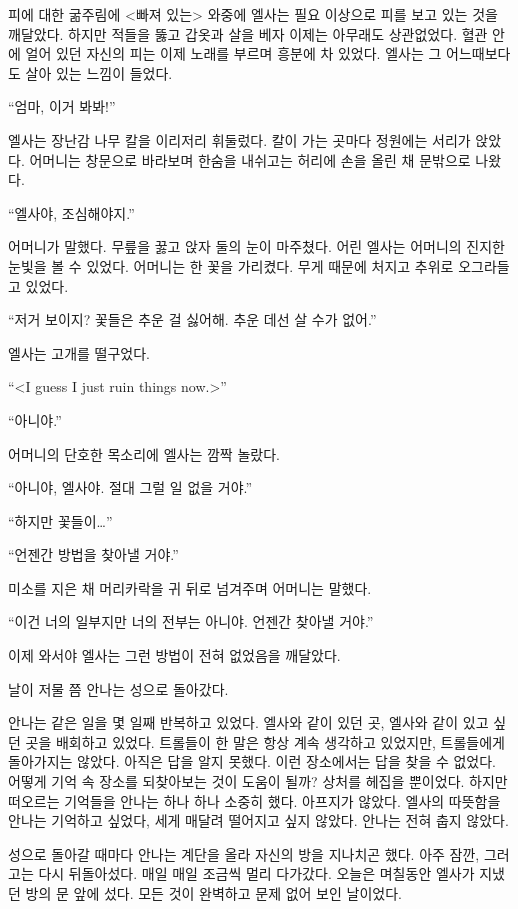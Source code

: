 피에 대한 굶주림에 <빠져 있는> 와중에 엘사는 필요 이상으로 피를 보고 있는 것을 깨달았다. 하지만 적들을 뚫고 갑옷과 살을 베자 이제는 아무래도 상관없었다. 혈관 안에 얼어 있던 자신의 피는 이제 노래를 부르며 흥분에 차 있었다. 엘사는 그 어느때보다도 살아 있는 느낌이 들었다.

``엄마, 이거 봐봐!''

엘사는 장난감 나무 칼을 이리저리 휘둘렀다. 칼이 가는 곳마다 정원에는 서리가 앉았다. 어머니는 창문으로 바라보며 한숨을 내쉬고는 허리에 손을 올린 채 문밖으로 나왔다.

``엘사야, 조심해야지.''

어머니가 말했다. 무릎을 꿇고 앉자 둘의 눈이 마주쳤다. 어린 엘사는 어머니의 진지한 눈빛을 볼 수 있었다. 어머니는 한 꽃을 가리켰다. 무게 때문에 처지고 추위로 오그라들고 있었다.

``저거 보이지? 꽃들은 추운 걸 싫어해. 추운 데선 살 수가 없어.''

엘사는 고개를 떨구었다.

``<I guess I just ruin things now.>''

``아니야.''

어머니의 단호한 목소리에 엘사는 깜짝 놀랐다.

``아니야, 엘사야. 절대 그럴 일 없을 거야.''

``하지만 꽃들이\ldots''

``언젠간 방법을 찾아낼 거야.''

미소를 지은 채 머리카락을 귀 뒤로 넘겨주며 어머니는 말했다.

``이건 너의 일부지만 너의 전부는 아니야. 언젠간 찾아낼 거야.''

이제 와서야 엘사는 그런 방법이 전혀 없었음을 깨달았다.

\textbreak

날이 저물 쯤 안나는 성으로 돌아갔다.

안나는 같은 일을 몇 일째 반복하고 있었다. 엘사와 같이 있던 곳, 엘사와 같이 있고 싶던 곳을 배회하고 있었다. 트롤들이 한 말은 항상 계속 생각하고 있었지만, 트롤들에게 돌아가지는 않았다. 아직은 답을 알지 못했다. 이런 장소에서는 답을 찾을 수 없었다. 어떻게 기억 속 장소를 되찾아보는 것이 도움이 될까? 상처를 헤집을 뿐이었다. 하지만 떠오르는 기억들을 안나는 하나 하나 소중히 했다. 아프지가 않았다. 엘사의 따뜻함을 안나는 기억하고 싶었다, 세게 매달려 떨어지고 싶지 않았다. 안나는 전혀 춥지 않았다.

성으로 돌아갈 때마다 안나는 계단을 올라 자신의 방을 지나치곤 했다. 아주 잠깐, 그러고는 다시 뒤돌아섰다. 매일 매일 조금씩 멀리 다가갔다. 오늘은 며칠동안 엘사가 지냈던 방의 문 앞에 섰다. 모든 것이 완벽하고 문제 없어 보인 날이었다.

